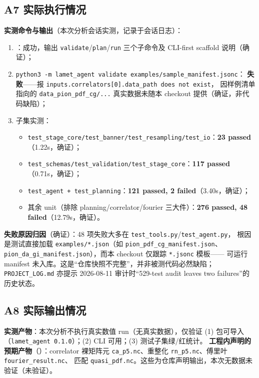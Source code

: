 \documentclass[UTF8]{ctexart}
\begin{document}
\subsection{A7 实际执行情况}

\textbf{实测命令与输出}（本次分析会话实测，记录于会话日志）：

\begin{enumerate}
\item \texttt{}：成功，输出 \texttt{validate}/\texttt{plan}/\texttt{run}
三个子命令及 CLI-first scaffold 说明（确证）；
\item \texttt{\nolinkurl{python3 -m lamet_agent validate examples/sample_manifest.jsonc}}：
\textbf{失败}——报 \texttt{\nolinkurl{inputs.correlators[0].data_path does not exist}}，
因样例清单指向的 \texttt{\nolinkurl{data_pion_pdf_cg/...}} 真实数据未随本 checkout 提供（确证，非代码缺陷）；
\item \texttt{} 子集实测：
  \begin{itemize}
  \item \texttt{test\_stage\_core/test\_banner/test\_resampling/test\_io}：\textbf{23 passed}
  （1.22s，确证）；
  \item \texttt{test\_schemas/test\_validation/test\_stage\_core}：\textbf{117 passed}（0.71s，确证）；
  \item \texttt{test\_agent + test\_planning}：\textbf{121 passed, 2 failed}（3.40s，确证）；
  \item 其余 unit（排除 planning/correlator/fourier 三大件）：\textbf{276 passed, 48 failed}（12.79s，确证）。
  \end{itemize}
\end{enumerate}

\textbf{失败原因归因}（确证）：48 项失败大多在 \texttt{test\_tools.py}/\texttt{test\_agent.py}，
根因是测试直接加载 \texttt{examples/*.json}（如 \texttt{pion\_pdf\_cg\_manifest.json}、
\texttt{pion\_da\_gi\_manifest.json}），而本 checkout 仅跟踪 \texttt{*.jsonc} 模板——
可运行 manifest 未入库。这是“仓库快照不完整”，并非被测代码必然缺陷；
\texttt{PROJECT\_LOG.md} 亦提示 2026-08-11 审计时“529-test audit leaves two failures”的历史状态。

\subsection{A8 实际输出情况}

\textbf{实测产物}：本次分析不执行真实数值 run（无真实数据），仅验证
(1) 包可导入（\texttt{lamet\_agent 0.1.0}）；(2) CLI 可用；(3) 测试子集绿/红统计。
\textbf{工程内声明的预期产物}（\texttt{}）：correlator 裸矩阵元
\texttt{ca\_p5.nc}、重整化 \texttt{rn\_p5.nc}、傅里叶 \texttt{fourier\_result.nc}、
匹配 \texttt{quasi\_pdf.nc}。这些为仓库声明输出，本次无数据未验证（\textcolor{warn}{未验证}）。
\end{document}
